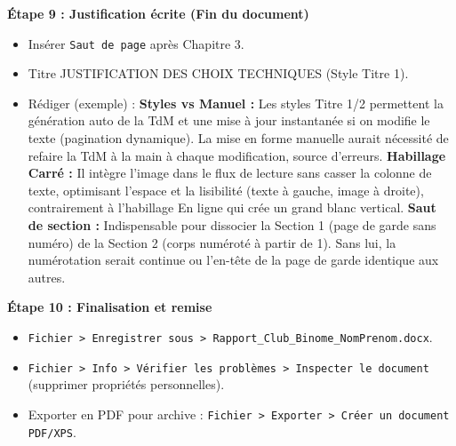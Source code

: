 \documentclass[11pt]{article}
\begin{document}
\begin{exoresolu}
\textbf{Étape 9 : Justification écrite (Fin du document)}
\begin{itemize}
    \item Insérer \texttt{Saut de page} après Chapitre 3.
    \item Titre \og JUSTIFICATION DES CHOIX TECHNIQUES \fg (Style Titre 1).
    \item Rédiger (exemple) :
    \og \textbf{Styles vs Manuel :} Les styles Titre 1/2 permettent la génération auto de la TdM et une mise à jour instantanée si on modifie le texte (pagination dynamique). La mise en forme manuelle aurait nécessité de refaire la TdM à la main à chaque modification, source d'erreurs.
    \textbf{Habillage Carré :} Il intègre l'image dans le flux de lecture sans casser la colonne de texte, optimisant l'espace et la lisibilité (texte à gauche, image à droite), contrairement à l'habillage \og En ligne \fg{} qui crée un grand blanc vertical.
    \textbf{Saut de section :} Indispensable pour dissocier la Section 1 (page de garde sans numéro) de la Section 2 (corps numéroté à partir de 1). Sans lui, la numérotation serait continue ou l'en-tête de la page de garde identique aux autres. \fg
\end{itemize}

\textbf{Étape 10 : Finalisation et remise}
\begin{itemize}
    \item \texttt{Fichier > Enregistrer sous > Rapport\_Club\_Binome\_NomPrenom.docx}.
    \item \texttt{Fichier > Info > Vérifier les problèmes > Inspecter le document} (supprimer propriétés personnelles).
    \item Exporter en PDF pour archive : \texttt{Fichier > Exporter > Créer un document PDF/XPS}.
\end{itemize}
\end{exoresolu}
\end{document}
